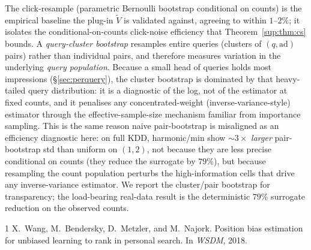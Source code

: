 \documentclass[11pt]{article}
\begin{document}
The click-resample (parametric Bernoulli bootstrap conditional on
counts) is the empirical baseline the plug-in $\widetilde V$ is
validated against, agreeing to within $1$--$2\%$; it isolates the
conditional-on-counts click-noise efficiency that
Theorem~\ref{sup:thm:cs} bounds. A \emph{query-cluster bootstrap}
resamples entire queries (clusters of $(q,\mathrm{ad})$ pairs) rather
than individual pairs, and therefore measures variation in the
underlying \emph{query population}. Because a small head of queries
holds most impressions (\S\ref{sec:perquery}), the cluster bootstrap is
dominated by that heavy-tailed query distribution: it is a diagnostic of
the log, not of the estimator at fixed counts, and it penalises any
concentrated-weight (inverse-variance-style) estimator through the
effective-sample-size mechanism familiar from importance sampling. This
is the same reason naive pair-bootstrap is misaligned as an efficiency
diagnostic here: on full KDD, harmonic/min show $\sim\!3\times$
\emph{larger} pair-bootstrap std than uniform on $(1,2)$, not because
they are less precise conditional on counts (they reduce the surrogate
by $79\%$), but because resampling the count population perturbs the
high-information cells that drive any inverse-variance estimator. We
report the cluster/pair bootstrap for transparency; the load-bearing
real-data result is the deterministic $79\%$ surrogate reduction on the
observed counts.

\begin{thebibliography}{1}
X.~Wang, M.~Bendersky, D.~Metzler, and M.~Najork.
\newblock Position bias estimation for unbiased learning to rank in
personal search.
\newblock In {\em WSDM}, 2018.
\end{thebibliography}
\end{document}
